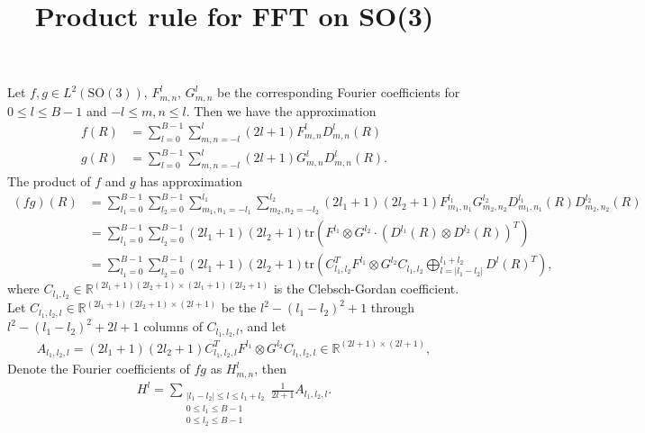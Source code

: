 \documentclass[12pt]{article}
\title{\vspace{-4ex}\textbf{Product rule for FFT on SO(3)\vspace{-4ex}}}
\date{}
\newcommand{\SO}{\ensuremath{\mathrm{SO}(3)}}
\newcommand{\tr}[1]{\ensuremath{\mathrm{tr}\left( #1 \right)}}
\newcommand{\abs}[1]{\ensuremath{\left| #1 \right|}}
\newcommand{\real}{\ensuremath{\mathbb{R}}}
\begin{document}
\maketitle

Let $f,g\in L^2(\SO)$, $F_{m,n}^l$, $G_{m,n}^l$ be the corresponding Fourier coefficients for $0\leq l \leq B-1$ and $-l\leq m,n\leq l$.
Then we have the approximation
\begin{align*}
	f(R) &= \sum_{l=0}^{B-1} \sum_{m,n=-l}^l (2l+1) F_{m,n}^l D_{m,n}^l(R) \\
	g(R) &= \sum_{l=0}^{B-1} \sum_{m,n=-l}^l (2l+1) G_{m,n}^l D_{m,n}^l(R).
\end{align*}
The product of $f$ and $g$ has approximation
\begin{align*}
	(fg)(R) &= \sum_{l_1=0}^{B-1} \sum_{l_2=0}^{B-1} \sum_{m_1,n_1=-l_1}^{l_1} \sum_{m_2,n_2=-l_2}^{l_2} (2l_1+1)(2l_2+1) F_{m_1,n_1}^{l_1} G_{m_2,n_2}^{l_2} D_{m_1,n_1}^{l_1}(R) D_{m_2,n_2}^{l_2}(R) \\
	&= \sum_{l_1=0}^{B-1} \sum_{l_2=0}^{B-1} (2l_1+1)(2l_2+1) \tr{F^{l_1} \otimes G^{l_2} \cdot \left(D^{l_1}(R) \otimes D^{l_2}(R)\right)^T} \\
	&= \sum_{l_1=0}^{B-1} \sum_{l_2=0}^{B-1} (2l_1+1)(2l_2+1) \tr{C_{l_1,l_2}^T F^{l_1} \otimes G^{l_2} C_{l_1,l_2} \bigoplus_{l=\abs{l_1-l_2}}^{l_1+l_2} D^l(R)^T},
\end{align*}
where $C_{l_1,l_2} \in \real^{(2l_1+1)(2l_2+1) \times (2l_1+1)(2l_2+1)}$ is the Clebsch-Gordan coefficient. 
Let $C_{l_1,l_2,l} \in \real^{(2l_1+1)(2l_2+1) \times (2l+1)}$ be the $l^2-(l_1-l_2)^2+1$ through $l^2-(l_1-l_2)^2+2l+1$ columns of $C_{l_1,l_2,l}$, and let
\begin{align*}
	A_{l_1,l_2,l} = (2l_1+1)(2l_2+1) C_{l_1,l_2,l}^T F^{l_1} \otimes G^{l_2} C_{l_1,l_2,l} \in \real^{(2l+1) \times (2l+1)},
\end{align*}
Denote the Fourier coefficients of $fg$ as $H_{m,n}^l$, then
\begin{align*}
	H^l = \sum_{\substack{\abs{l_1-l_2} \leq l \leq l_1+l_2 \\ 0 \leq l_1 \leq B-1 \\ 0 \leq l_2 \leq B-1}} \frac{1}{2l+1} A_{l_1,l_2,l}.
\end{align*}
\end{document}
